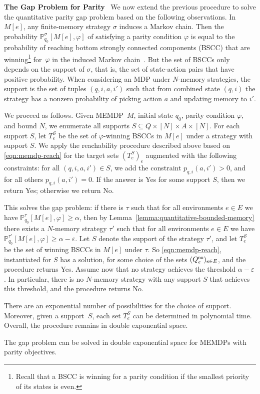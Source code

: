 \documentclass[a4paper,USenglish,cleveref, autoref, thm-restate]{lipics-v2021}
\let\epsilon\varepsilon
\def\myparagraph#1{\noindent\textbf{#1}~}
\newcommand*{\pr}{\mathbb{P}}
\begin{document}
\smallskip
\myparagraph{The Gap Problem for Parity}
We now extend the previous procedure to solve the quantitative parity gap problem based on the following observations.
In $M[e]$, any finite-memory strategy $\sigma$ induces a Markov chain. Then the probability $\pr_{q_0}^\sigma[M[e], \varphi]$
of satisfying a parity condition $\varphi$ is equal to the probability of reaching bottom strongly connected components (BSCC) 
that are winning\footnote{Recall that a BSCC is winning for a parity condition if the smallest priority of its states is even.} 
for~$\varphi$ in the induced Markov chain~\cite{BK08}. 
But the set of BSCCs only depends on the support of $\sigma$, that is, the set of state-action pairs that have positive probability.
When considering an MDP under $N$-memory strategies, the support is the set of tuples $(q,i,a,i')$ such that
from combined state $(q,i)$ the strategy has a nonzero probability of picking action $a$ and updating memory to $i'$.

We proceed as follows. Given MEMDP~$M$, initial state $q_0$, parity condition $\varphi$, and bound $N$, we enumerate 
all supports $S \subseteq Q \times [N] \times A \times [N]$. 
For each support $S$, let $T^S_e$ be the set of $\varphi$-winning BSCCs in $M[e]$ under a strategy with support $S$.
We apply the reachability procedure described above based on \eqref{eqn:memdp-reach} for the target sets $(T^S_e)_e$ 
augmented with the following constraints:
for all $(q,i,a,i') \in S$, we add the constraint $p_{q,i}(a,i')>0$, and for all others $p_{q,i}(a,i')=0$.
If the answer is \textsf{Yes} for some support $S$, then we return \textsf{Yes}; otherwise we return \textsf{No}.

This solves the gap problem:
if there is $\tau$ such that for all environments $e \in E$ we have $\pr_{q_0}^{\tau}[M[e],\varphi]\geq \alpha$,
then by Lemma~\ref{lemma:quantitative-bounded-memory} there exists a $N$-memory strategy $\tau'$ 
such that for all environments $e \in E$ we have $\pr_{q_0}^{\tau'}[M[e],\varphi]\geq \alpha-\epsilon$.
Let $S$ denote the support of the strategy $\tau'$, and let $T_e^S$ be the set of winning BSCCs in $M[e]$ under $\tau$.
So \eqref{eqn:memdp-reach}, instantiated for $S$
has a solution, for some choice of the sets $(Q^{\textsf{no}}_e)_{e\in E}$, and
the procedure returns \textsf{Yes}.
Assume now that no strategy achieves the threshold $\alpha-\epsilon$. In particular, there is no $N$-memory strategy
with any support $S$ that 
achieves this threshold, and the procedure returns \textsf{No}.

There are an exponential number of possibilities for the choice of support. Moreover, given a support~$S$,
each set $T^S_e$ can be determined in polynomial time. Overall, the procedure remains in double exponential space.


  \begin{theorem}
    The gap problem can be solved in double exponential space for MEMDPs with parity objectives.
  \end{theorem}





\end{document}

